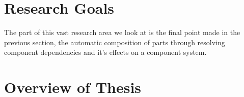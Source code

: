 \documentclass{report}
\begin{document}
\section{Research Goals}
{}The part of this vast research area we look at is the final point made in the previous section, 
{}the automatic composition of parts through resolving component dependencies and it's effects on a component system.


\section{Overview of Thesis}

















\end{document}
